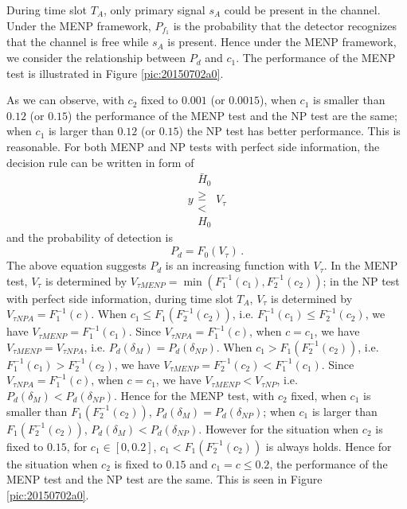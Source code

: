 During time slot $T_A$, only primary signal $s_A$ could be present in the channel. Under the MENP framework, $P_{f_1}$ is the probability that the detector recognizes that the channel is free while $s_A$ is present. 
Hence under the MENP framework, we consider the relationship between $P_d$ and $c_1$. The performance of the MENP test is illustrated in Figure \ref{pic:20150702a0}.  

As we can observe, with $c_2$  fixed to $0.001$ (or $0.0015$), when $c_1$ is smaller than $0.12$ (or $0.15$) the performance of the MENP test and the NP test are the same; when $c_1$ is larger than $0.12$ (or $0.15$) the NP test has better performance. This is reasonable.  
For both MENP and NP tests with perfect side information, the decision rule can be written in form of
\begin{equation}
  y  \substack{\bar{H}_0 \\ \geq \\ < \\ H_0} V_\tau
\end{equation}
and the probability of detection is 
\begin{equation}
  P_d = F_0(V_\tau)\,.
\end{equation}
The above equation suggests $P_d$ is an increasing function with $V_\tau$. 
In the MENP test, $V_\tau$ is determined by $V_{\tau MENP}= \min (F_1^{-1}(c_1), F_2^{-1}(c_2))$; in the NP test with perfect side information, during time slot $T_A$, $V_\tau$ is determined by $V_{\tau NP A} = F_1^{-1}(c)$. When $c_1 \leq F_1(F_2^{-1}(c_2))$, i.e. $F_1^{-1}(c_1) \leq  F_2^{-1}(c_2)$, we have  $V_{\tau MENP} = F_1^{-1}(c_1)$. Since $V_{\tau NP A} = F_1^{-1}(c)$, when $c = c_1$, we have $V_{\tau MENP} = V_{\tau NPA}$, i.e.  $P_d(\delta_M) = P_d(\delta_{NP})$.    
When $c_1 > F_1(F_2^{-1}(c_2))$, i.e. $F_1^{-1}(c_1) > F_2^{-1}(c_2)$, we have  $V_{\tau MENP} = F_2^{-1}(c_2) < F_1^{-1}(c_1)$. Since $V_{\tau NP A} = F_1^{-1}(c)$, when $c = c_1$, we have 
$V_{\tau MENP} < V_{\tau NP}$, i.e.  $P_d(\delta_M) < P_d(\delta_{NP})$.
Hence for the MENP test, with $c_2$ fixed, when $c_1$ is smaller than $F_1( F_2^{-1}(c_2) ) $, $P_d(\delta_M) = P_d(\delta_{NP})$; when $c_1$ is larger than $ F_1( F_2^{-1}(c_2))$, $P_d(\delta_M) < P_d(\delta_{NP})$. 
However for the situation when  $c_2$ is fixed to $0.15$, for $c_1 \in [0, 0.2]$, $c_1 <  F_1(F_2^{-1}(c_2))$ is always holds. Hence for the situation when $c_2$ is fixed to $0.15$ and $c_1 = c \leq 0.2$, the performance of the MENP test and the NP test are the same. This is seen in Figure \ref{pic:20150702a0}. 

